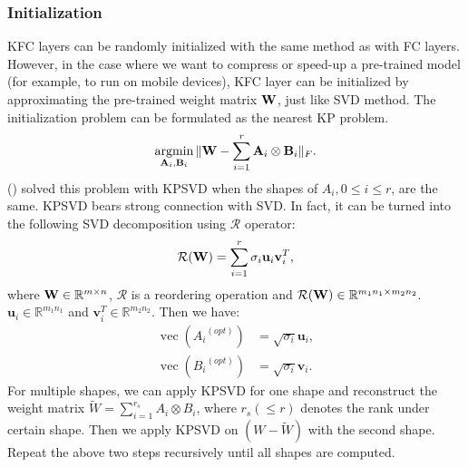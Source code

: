 \documentclass{article}
\def\A{{\bf A}}
\def\B{{\bf B}}
\def\W{{\bf W}}
\def\RB{{\mathbb R}}
\def\vect{\operatorname{vec}}
\DeclareMathOperator*{\argmin}{arg min}
\begin{document}
\subsubsection{Initialization}
KFC layers can be randomly initialized with the same method as with FC layers. However, in the case where we want to compress or speed-up a pre-trained model (for example, to run on mobile devices),
KFC layer can be initialized by approximating the pre-trained weight matrix $\W$, just like SVD method. The initialization problem can be formulated as the nearest KP problem.
\begin{align}
\argmin_{\A_i, \B_i} \|\W - \sum_{i=1}^{r}\A_i \otimes \B_i\|_F.
\end{align}
\citeauthor{van1993approximation}  (\citeyear{van1993approximation}) solved this problem with KPSVD when the shapes of $A_i, 0\leq i \leq r$, are the same. KPSVD bears strong connection with SVD. In fact, it can be turned into the following SVD decomposition using $\mathcal{R}$  operator:
\begin{align}
  \mathcal{R}(\W) = \sum_{i=1}^{r}\sigma_i \mathbf{u}_i \mathbf{v}_i^T,
\end{align}
where $\W\in \RB^{m\times n}$, $\mathcal{R}$ is a reordering operation and $\mathcal{R}(\W) \in \RB^{m_1n_1 \times m_2n_2}$.
$\mathbf{u}_i \in \RB^{m_1n_1}$ and $\mathbf{v}_i^T \in \RB^{m_2n_2}$. Then we have:
\begin{align}
  \vect\left({A_i}^{(opt)}\right) &= \sqrt{\sigma_i}\mathbf{u}_i, \\
  \vect\left({B_i}^{(opt)}\right) &= \sqrt{\sigma_i}\mathbf{v}_i.
\end{align}
For multiple shapes, we can apply KPSVD for one shape and reconstruct the weight matrix
$\tilde{W} = \sum_{i=1}^{r_s}A_i\otimes B_i$, where $r_s (\leq r)$ denotes the rank under certain shape. Then we apply KPSVD on $(W-\tilde{W})$ with the second shape. Repeat the above two steps recursively until all shapes are computed.
\end{document}
